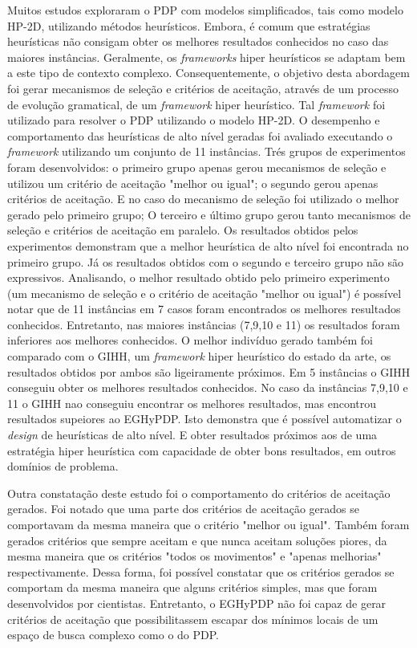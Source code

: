 		Muitos estudos exploraram o PDP com modelos simplificados, tais como modelo HP-2D, utilizando métodos heurísticos. Embora, é comum que estratégias heurísticas não consigam obter os melhores resultados conhecidos no caso das maiores instâncias. Geralmente, os \textit{frameworks} hiper heurísticos se adaptam bem a este tipo de contexto complexo. Consequentemente, o objetivo desta abordagem foi gerar mecanismos de seleção e critérios de aceitação, através de um processo de evolução gramatical, de um \textit{framework} hiper heurístico. Tal \textit{framework} foi utilizado para resolver o PDP utilizando o modelo HP-2D. O desempenho e comportamento das heurísticas de alto nível geradas foi avaliado executando o \textit{framework} utilizando um conjunto de 11 instâncias. 
		Trés grupos de experimentos foram desenvolvidos: o primeiro grupo apenas gerou mecanismos de seleção e utilizou um critério de aceitação "melhor ou igual"; o segundo gerou apenas critérios de aceitação. E no caso do mecanismo de seleção foi utilizado o melhor gerado pelo primeiro grupo; O terceiro e último grupo gerou tanto mecanismos de seleção e critérios de aceitação em paralelo. Os resultados obtidos pelos experimentos demonstram que a melhor heurística de alto nível foi encontrada no primeiro grupo. Já os resultados obtidos com o segundo e terceiro grupo não são expressivos. Analisando, o melhor resultado obtido pelo primeiro experimento (um mecanismo de seleção e o critério de aceitação "melhor ou igual") é possível notar que de 11 instâncias em 7 casos foram encontrados os melhores resultados conhecidos. Entretanto, nas maiores instâncias (7,9,10 e 11) os resultados foram inferiores aos melhores conhecidos. 
		O melhor indivíduo gerado também foi comparado com o GIHH, um \textit{framework} hiper heurístico do estado da arte, os resultados obtidos por ambos são ligeiramente próximos. Em 5 instâncias o GIHH conseguiu obter os melhores resultados conhecidos. No caso da instâncias 7,9,10 e 11 o GIHH nao conseguiu encontrar os melhores resultados, mas encontrou resultados supeiores ao EGHyPDP. Isto demonstra que é possível automatizar o \textit{design} de heurísticas de alto nível. E obter resultados próximos aos de uma estratégia hiper heurística com capacidade de obter bons resultados, em outros domínios de problema.
		
		Outra constatação deste estudo foi o comportamento do critérios de aceitação gerados. Foi notado que uma parte dos critérios de aceitação gerados se comportavam da mesma maneira que o critério "melhor ou igual". Também foram gerados critérios que sempre aceitam e que nunca aceitam soluções piores, da mesma maneira que os critérios "todos os movimentos" e "apenas melhorias" respectivamente. Dessa forma, foi possível constatar que os critérios gerados se comportam da mesma maneira que alguns critérios simples, mas que foram desenvolvidos por cientistas. Entretanto, o EGHyPDP não foi capaz de gerar critérios de aceitação que possibilitassem escapar dos mínimos locais de um espaço de busca complexo como o do PDP.

	
	
